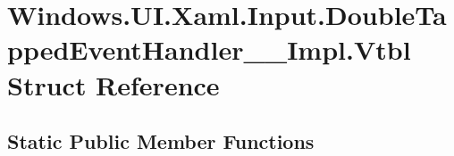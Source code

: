 \hypertarget{struct_windows_1_1_u_i_1_1_xaml_1_1_input_1_1_double_tapped_event_handler_____impl_1_1_vtbl}{}\section{Windows.\+U\+I.\+Xaml.\+Input.\+Double\+Tapped\+Event\+Handler\+\_\+\+\_\+\+Impl.\+Vtbl Struct Reference}
\label{struct_windows_1_1_u_i_1_1_xaml_1_1_input_1_1_double_tapped_event_handler_____impl_1_1_vtbl}
\subsection*{Static Public Member Functions}
